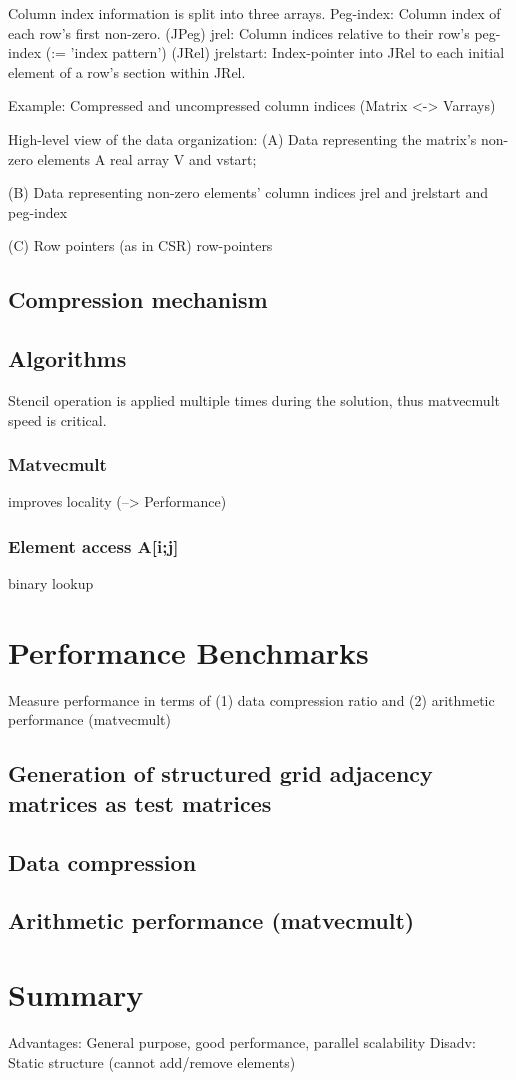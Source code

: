 \documentclass{article}
\begin{document}
    Column index information is split into three arrays.
    Peg-index: Column index of each row's first non-zero. (JPeg)
    jrel: Column indices relative to their row's peg-index (:= 'index pattern') (JRel)
    jrelstart: Index-pointer into JRel to each initial element of a row's section within JRel.

      Example: Compressed and uncompressed column indices (Matrix <-> Varrays)

    High-level view of the data organization:
    (A) Data representing the matrix's non-zero elements
      A real array V  and vstart;

    (B) Data representing non-zero elements' column indices
      jrel and jrelstart and peg-index

    (C) Row pointers (as in CSR) row-pointers

  \subsection{Compression mechanism}

  \subsection{Algorithms}

    Stencil operation is applied multiple times during the solution, thus matvecmult speed is critical.

    \subsubsection{Matvecmult}

      improves locality (--> Performance)

    \subsubsection{Element access A[i;j]}
      binary lookup
\section{Performance Benchmarks}
  Measure performance in terms of (1) data compression ratio and (2) arithmetic performance (matvecmult)

  \subsection{Generation of structured grid adjacency matrices as test matrices}

  \subsection{Data compression}

  \subsection{Arithmetic performance (matvecmult)}

\section{Summary}
  Advantages: General purpose, good performance, parallel scalability
  Disadv: Static structure (cannot add/remove elements)

\printbibliography
\end{document}
